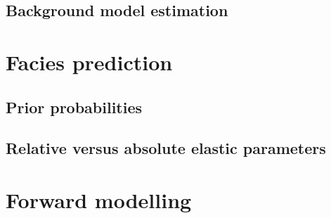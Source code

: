 \subsection{Background model estimation}
\section{Facies prediction}
\subsection{Prior probabilities}
\subsection{Relative versus absolute elastic parameters}
\section{Forward modelling}
